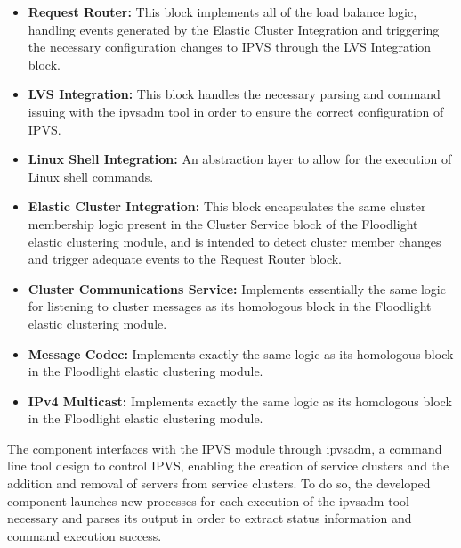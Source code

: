 \begin{itemize}
	\item \textbf{Request Router:} This block implements all of the load balance logic, handling events generated by the Elastic Cluster Integration and triggering the necessary configuration changes to \gls{IPVS} through the LVS Integration block.
	\item \textbf{LVS Integration:} This block handles the necessary parsing and command issuing with the ipvsadm tool in order to ensure the correct configuration of \gls{IPVS}. 
	\item \textbf{Linux Shell Integration:} An abstraction layer to allow for the execution of Linux shell commands.
	\item \textbf{Elastic Cluster Integration:} This block encapsulates the same cluster membership logic present in the Cluster Service block of the Floodlight elastic clustering module, and is intended to detect cluster member changes and trigger adequate events to the Request Router block.
	\item \textbf{Cluster Communications Service:} Implements essentially the same logic for listening to cluster messages as its homologous block in the Floodlight elastic clustering module.
	\item \textbf{Message Codec:} Implements exactly the same logic as its homologous block in the Floodlight elastic clustering module.
	\item \textbf{IPv4 Multicast:} Implements exactly the same logic as its homologous block in the Floodlight elastic clustering module.
\end{itemize}
%
The component interfaces with the \gls{IPVS} module through ipvsadm, a command line tool design to control \gls{IPVS}, enabling the creation of service clusters and the addition and removal of servers from service clusters.
To do so, the developed component launches new processes for each execution of the ipvsadm tool necessary and parses its output in order to extract status information and command execution success.
%
